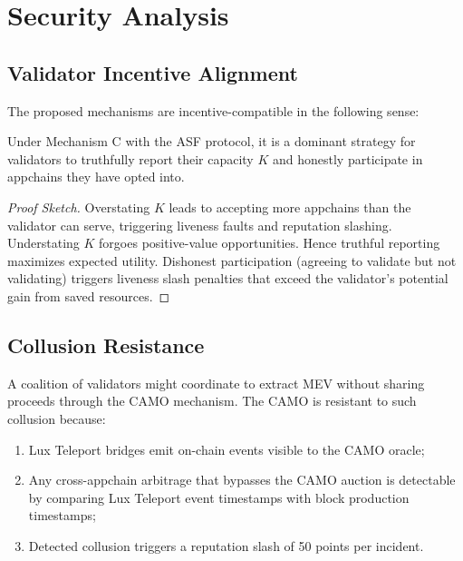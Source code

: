 \section{Security Analysis}


\subsection{Validator Incentive Alignment}

The proposed mechanisms are incentive-compatible in the following sense:

\begin{theorem}
Under Mechanism C with the ASF protocol, it is a dominant strategy for validators to
truthfully report their capacity $K$ and honestly participate in appchains they have opted into.
\end{theorem}

\begin{proof}[Proof Sketch]
Overstating $K$ leads to accepting more appchains than the validator can serve, triggering
liveness faults and reputation slashing. Understating $K$ forgoes positive-value
opportunities. Hence truthful reporting maximizes expected utility. Dishonest participation
(agreeing to validate but not validating) triggers liveness slash penalties that exceed
the validator's potential gain from saved resources.
\end{proof}

\subsection{Collusion Resistance}

A coalition of validators might coordinate to extract MEV without sharing proceeds
through the CAMO mechanism. The CAMO is resistant to such collusion because:

\begin{enumerate}[leftmargin=1.5em]
  \item Lux Teleport bridges emit on-chain events visible to the CAMO oracle;
  \item Any cross-appchain arbitrage that bypasses the CAMO auction is detectable by
    comparing Lux Teleport event timestamps with block production timestamps;
  \item Detected collusion triggers a reputation slash of 50 points per incident.
\end{enumerate}

